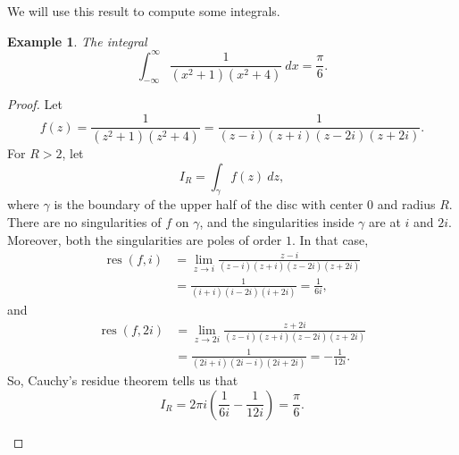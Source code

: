 \documentclass[a4paper, openany]{memoir}
\theoremstyle{definition}
\theoremstyle{plain}
\newtheorem{example}[definition]{Example}
\begin{document}
We will use this result to compute some integrals.
\begin{example}
    The integral 
    \[\int_{-\infty}^\infty \frac{1}{(x^2 + 1)(x^2 + 4)} \ dx = \frac{\pi}{6}.\]
\end{example}
\begin{proof}
    Let
    \[f(z) = \frac{1}{(z^2 + 1)(z^2 + 4)} = \frac{1}{(z - i)(z + i)(z - 2i)(z + 2i)}.\]
    For $R > 2$, let
    \[I_R = \int_\gamma f(z) \ dz,\]
    where $\gamma$ is the boundary of the upper half of the disc with center $0$ and radius $R$. There are no singularities of $f$ on $\gamma$, and the singularities inside $\gamma$ are at $i$ and $2i$. Moreover, both the singularities are poles of order $1$. In that case,
    \begin{align*}
        \operatorname{res}(f, i) &= \lim_{z \to i} \frac{z - i}{(z - i)(z + i)(z - 2i)(z + 2i)} \\
        &= \frac{1}{(i + i)(i - 2i)(i + 2i)} = \frac{1}{6i},
    \end{align*}
    and
    \begin{align*}
        \operatorname{res}(f, 2i) &= \lim_{z \to 2i} \frac{z + 2i}{(z - i)(z + i)(z - 2i)(z + 2i)} \\
        &= \frac{1}{(2i + i)(2i - i)(2i + 2i)} = -\frac{1}{12i}.
    \end{align*}
    So, Cauchy's residue theorem tells us that
    \[I_R = 2\pi i \left(\frac{1}{6i} - \frac{1}{12i}\right) = \frac{\pi}{6}.\]
    \begin{figure}[H]
        \centering
\end{figure}
\end{proof}
\end{document}
